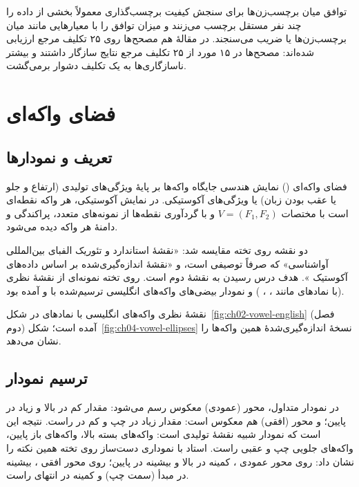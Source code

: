 \begin{addedbox}{توافق میان برچسب‌زن‌ها}
برای سنجش کیفیت برچسب‌گذاری معمولاً بخشی از داده را چند نفر مستقل برچسب می‌زنند و میزان توافق را با معیارهایی مانند  میان برچسب‌زن‌ها یا ضریب  می‌سنجند. در مقالهٔ  هم مصحح‌ها روی ۲۵ تکلیف مرجع ارزیابی شده‌اند: مصحح‌ها در ۱۵ مورد از ۲۵ تکلیف مرجع نتایج سازگار داشتند و بیشتر ناسازگاری‌ها به یک تکلیف دشوار برمی‌گشت.
\end{addedbox}

\section{فضای واکه‌ای}
\subsection{تعریف و نمودارها}
\begin{definitionbox}{فضای واکه‌ای ()}
نمایش هندسی جایگاه واکه‌ها بر پایهٔ ویژگی‌های تولیدی (ارتفاع و جلو یا عقب بودن زبان) یا ویژگی‌های آکوستیکی. در نمایش آکوستیکی، هر واکه نقطه‌ای است با مختصات $V=(F_1,F_2)$ و با گردآوری نقطه‌ها از نمونه‌های متعدد، پراکندگی و دامنهٔ هر واکه دیده می‌شود.
\end{definitionbox}

دو نقشه روی تخته مقایسه شد: «نقشهٔ استاندارد و تئوریک الفبای بین‌المللی آواشناسی» که صرفاً توصیفی است، و «نقشهٔ اندازه‌گیری‌شده بر اساس داده‌های آکوستیک ». هدف درس رسیدن به نقشهٔ دوم است. روی تخته نمونه‌ای از نقشهٔ نظری (با نمادهای  مانند ، ، ) و نمودار بیضی‌های واکه‌های انگلیسی ترسیم‌شده با  و  آمده بود.

نقشهٔ نظری واکه‌های انگلیسی با نمادهای  در شکل~\ref{fig:ch02-vowel-english} (فصل دوم) آمده است؛ شکل~\ref{fig:ch04-vowel-ellipses} نسخهٔ اندازه‌گیری‌شدهٔ همین واکه‌ها را نشان می‌دهد.

\label{fig:ch04-vowel-ellipses}

\subsection{ترسیم نمودار }
در نمودار متداول، محور  (عمودی) معکوس رسم می‌شود: مقدار کم در بالا و زیاد در پایین؛ و محور  (افقی) هم معکوس است: مقدار زیاد در چپ و کم در راست. نتیجه این است که نمودار شبیه نقشهٔ تولیدی است: واکه‌های بسته بالا، واکه‌های باز پایین، واکه‌های جلویی چپ و عقبی راست. استاد با نموداری دست‌ساز روی تخته همین نکته را نشان داد: روی محور عمودی ، کمینه در بالا و بیشینه در پایین؛ روی محور افقی ، بیشینه در مبدأ (سمت چپ) و کمینه در انتهای راست.


